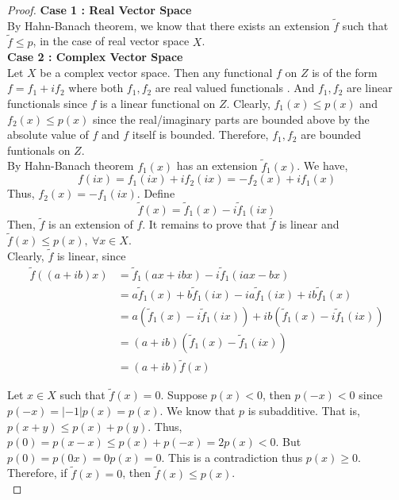 \begin{proof}
	\textbf{Case 1 : Real Vector Space}\\
	By Hahn-Banach theorem, we know that there exists an extension $\tilde{f}$ such that $\tilde{f} \le p$, in the case of real vector space $X$.\\

	\textbf{Case 2 : Complex Vector Space}\\
	Let $X$ be a complex vector space.
	Then any functional $f$ on $Z$ is of the form $f = f_1 + if_2$ where both $f_1,f_2$ are real valued functionals .
	And $f_1,f_2$ are linear functionals since $f$ is a linear functional on $Z$.
	Clearly, $f_1(x) \le p(x)$ and $f_2(x) \le p(x)$ since the real/imaginary parts are bounded above by the absolute value of $f$ and $f$ itself is bounded.
	Therefore, $f_1,f_2$ are bounded funtionals on $Z$.\\

	By Hahn-Banach theorem $f_1(x)$ has an extension $\tilde{f}_1(x)$.
	We have,	
	\[ f(ix) = f_1(ix)+if_2(ix) = -f_2(x)+if_1(x) \]
	Thus, $f_2(x) = -f_1(ix)$.
	Define
	\[ \tilde{f}(x) = \tilde{f}_1(x) - i \tilde{f}_1(ix) \]
	Then, $\tilde{f}$ is an extension of $f$.
	It remains to prove that $\tilde{f}$ is linear and $\tilde{f}(x) \le p(x),\ \forall x \in X$.\\

	Clearly, $\tilde{f}$ is linear, since
	\begin{align*}
		\tilde{f}((a+ib)x) 
		& = \tilde{f}_1(ax+ibx) - i\tilde{f}_1(iax-bx)\\
		& = a\tilde{f}_1(x) + b\tilde{f}_1(ix) - ia\tilde{f}_1(ix) + ib \tilde{f}_1(x) \\
		& = a \left(\tilde{f}_1(x)-i\tilde{f}_1(ix) \right) + ib \left(\tilde{f}_1(x)-i\tilde{f}_1(ix) \right) \\
		& = (a+ib) \left(\tilde{f}_1(x) - \tilde{f}_1(ix) \right) \\
		& = (a+ib)\tilde{f}(x)
	\end{align*}

	Let $x \in X$ such that $\tilde{f}(x) = 0$.
	Suppose $p(x) < 0$, then $p(-x) < 0$ since $p(-x) = |-1|p(x) = p(x)$.
	We know that $p$ is subadditive.
	That is, $p(x+y) \le p(x)+p(y)$.
	Thus, $p(0) = p(x-x) \le p(x) + p(-x) = 2p(x) < 0$.
	But $p(0) = p(0x) = 0p(x) = 0$.
	This is a contradiction thus $p(x) \ge 0$.
	Therefore, if $\tilde{f}(x) = 0$, then $\tilde{f}(x) \le p(x)$.\\


\end{proof}
